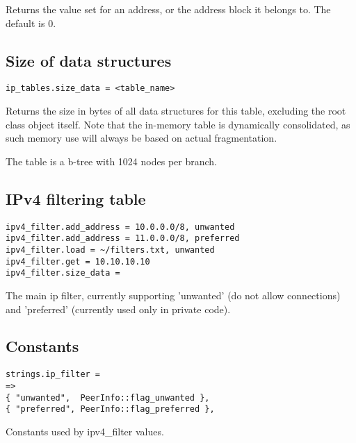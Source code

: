 Returns the value set for an address, or the address block it belongs
to. The default is $0$.


\subsection{Size of data structures}

\begin{verbatim}
ip_tables.size_data = <table_name>
\end{verbatim}

Returns the size in bytes of all data structures for this table,
excluding the root class object itself. Note that the in-memory table
is dynamically consolidated, as such memory use will always be based
on actual fragmentation.

The table is a b-tree with 1024 nodes per branch.


\subsection{IPv4 filtering table}

\begin{verbatim}
ipv4_filter.add_address = 10.0.0.0/8, unwanted
ipv4_filter.add_address = 11.0.0.0/8, preferred
ipv4_filter.load = ~/filters.txt, unwanted
ipv4_filter.get = 10.10.10.10
ipv4_filter.size_data =
\end{verbatim}

The main ip filter, currently supporting 'unwanted' (do not allow
connections) and 'preferred' (currently used only in private code).



\subsection{Constants}

\begin{verbatim}
strings.ip_filter =
=>
{ "unwanted",  PeerInfo::flag_unwanted },
{ "preferred", PeerInfo::flag_preferred },
\end{verbatim}

Constants used by ipv4_filter values.
